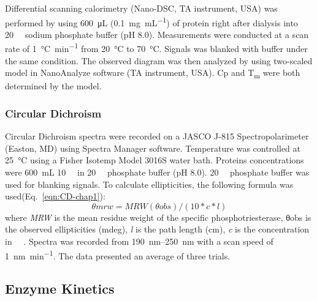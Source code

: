 \begin{refsection}
Differential scanning calorimetry (Nano-DSC, TA instrument, USA) was performed
by using \SI{600}{\micro\L} (\SI{0.1}{\mg\per\mL}) of protein right after
dialysis into \SI{20}{\milli\Molar} sodium phosphate buffer (pH 8.0).
Measurements were conducted at a scan rate of \SI{1}{\celsius\per\minute} from
\SI{20}{\celsius} to \SI{70}{\celsius}.  Signals was blanked with buffer under
the same condition.  The observed diagram was then analyzed by using
two-scaled model in NanoAnalyze software (TA instrument, USA). Cp and
T\textsubscript{m} were both determined by the model.

\subsubsection{Circular Dichroism}
\label{sec:cd-method}

Circular Dichroism spectra were recorded on a JASCO J-815 Spectropolarimeter
(Easton, MD) using Spectra Manager software. Temperature was controlled at
\SI{25}{\celsius} using a Fisher Isotemp Model 3016S water bath. Proteins
concentrations were \SI{600}{\mL} \SI{10}{\micro\Molar} in \SI{20}{\milli\Molar} phosphate
buffer (pH 8.0).  \SI{20}{\milli\Molar} phosphate buffer was used for blanking
signals. To calculate ellipticities, the following formula was
used(Eq.~\ref{eqn:CD-chap1}): 
\begin{equation}
    θmrw = MRW(θobs) / (10 * c * l) 
    \label{eqn:CD-chap1}
\end{equation}
where \emph{MRW} is the mean residue weight of the specific phosphotriesterase,
θobs is the observed ellipticities (mdeg), \emph{l} is the path length (cm),
\emph{c} is the concentration in \SI{}{\micro\Molar}. Spectra was recorded from
\SIrange{190}{250}{\nm} with a scan speed of \SI{1}{\nano\meter\per\minute}.
The data presented an average of three trials.

\subsection{Enzyme Kinetics}
\label{sec:kinetics-method}


\end{refsection}
